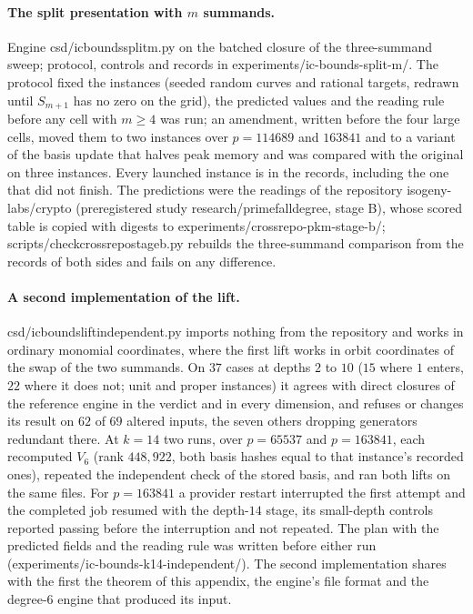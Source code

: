 \documentclass[11pt]{article}
\theoremstyle{definition}\newtheorem{definition}[theorem]{Definition}
\theoremstyle{remark}\newtheorem{remark}[theorem]{Remark}
\newcommand{\codeus}{\textunderscore\allowbreak}
\newcommand{\code}[1]{{\ttfamily\let\_\codeus#1}}
\begin{document}
\paragraph{The split presentation with $m$ summands.} Engine
\code{csd/ic\_bounds\_split\_m.py} on the batched closure of the
three-summand sweep; protocol, controls and records in
\code{experiments/\allowbreak{}ic-bounds-split-m/}. The protocol fixed the instances
(seeded random curves and rational targets, redrawn until $S_{m+1}$ has no
zero on the grid), the predicted values and the reading rule before any
cell with $m\ge4$ was run; an amendment, written before the four large
cells, moved them to two instances over $p=114689$ and $163841$ and to a
variant of the basis update that halves peak memory and was compared with
the original on three instances. Every launched instance is in the
records, including the one that did not finish. The predictions were the
readings of the repository \code{isogeny-labs/crypto} (preregistered study
\code{research/prime\_fall\_degree\_20261027}, stage B), whose scored table
is copied with digests to \code{experiments/\allowbreak{}crossrepo-pkm-stage-b/};
\code{scripts/check\_crossrepo\_stage\_b.py} rebuilds the three-summand
comparison from the records of both sides and fails on any difference.

\paragraph{A second implementation of the lift.}
\code{csd/ic\_bounds\_lift\_independent.py} imports nothing from the
repository and works in ordinary monomial coordinates, where the first
lift works in orbit coordinates of the swap of the two summands. On $37$
cases at depths $2$ to $10$ ($15$ where $1$ enters, $22$ where it does not;
unit and proper instances) it agrees with direct closures of the reference
engine in the verdict and in every dimension, and refuses or changes its
result on $62$ of $69$ altered inputs, the seven others dropping generators
redundant there. At $k=14$ two runs, over $p=65537$ and $p=163841$, each
recomputed $V_6$ (rank $448{,}922$, both basis hashes equal to that instance's
recorded ones), repeated the independent check of the stored basis, and ran
both lifts on the same files. For $p=163841$ a provider restart interrupted
the first attempt and the completed job resumed with the depth-$14$ stage, its
small-depth controls reported passing before the interruption and not
repeated. The plan with the predicted fields and the reading rule was written
before either run (\code{experiments/\allowbreak{}ic-bounds-k14-independent/}).
The second implementation shares with the first the theorem of this appendix,
the engine's file format and the degree-$6$ engine that produced its input.
\end{document}
